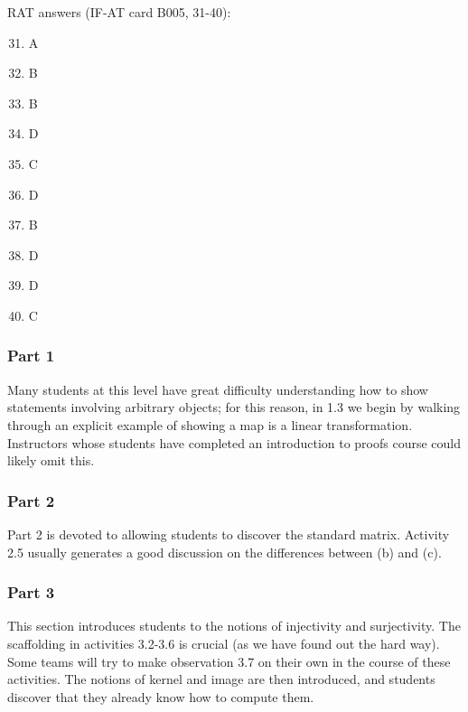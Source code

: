 \documentclass{article}
\begin{document}
RAT answers (IF-AT card B005, 31-40):
\begin{multicols}{10}
\begin{enumerate}[1)]
\setcounter{enumi}{30}
\item A
\item B
\item B
\item D
\item C
\item D
\item B
\item D
\item D
\item C
\end{enumerate}
\end{multicols}
\subsubsection*{Part 1}
Many students at this level have great difficulty understanding how to show statements involving arbitrary objects; for this reason, in 1.3 we begin by walking through an explicit example of showing a map is a linear transformation.  Instructors whose students have completed an introduction to proofs course could likely omit this.  

\subsubsection*{Part 2}
Part 2 is devoted to allowing students to discover the standard matrix.  Activity 2.5 usually generates a good discussion on the differences between (b) and (c).  

\subsubsection*{Part 3}
This section introduces students to the notions of injectivity and surjectivity.  The scaffolding in activities 3.2-3.6 is crucial (as we have found out the hard way).  Some teams will try to make observation 3.7 on their own in the course of these activities.  The notions of kernel and image are then introduced, and students discover that they already know how to compute them.
\end{document}
